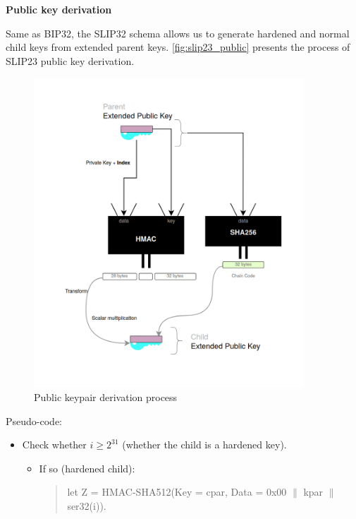 \begin{adjustwidth}{0.5cm}{}
\begin{itemize}
              \bigskip

    \end{itemize}


    \bigskip
    {\textbf{Public key derivation}}

    Same as BIP32, the SLIP32 schema allows us to generate hardened and normal child keys from extended parent keys. \autoref{fig:slip23_public} presents the process of SLIP23 public key derivation.
    \begin{figure}[ht!]
        \centering
        \includegraphics[width=0.9\textwidth]{images/slip23_public.png}
        \caption[Public keypair derivation process]{Public keypair derivation process}
        \label{fig:slip23_public}
    \end{figure}

    Pseudo-code:
    \begin{itemize}
        \item Check whether $i \geq 2^{31}$ (whether the child is a hardened key).
              \begin{itemize}
                  \item If so (hardened child):
                        \begin{quote}
                            let Z = HMAC-SHA512(Key = cpar, Data = 0x00 $\parallel$ kpar $\parallel$ ser32(i)).


\end{quote}
\end{itemize}
\end{itemize}
\end{adjustwidth}
